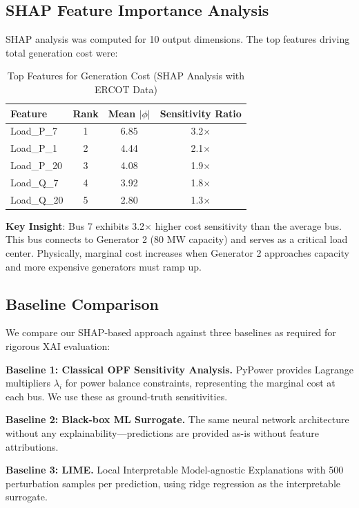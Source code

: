 \documentclass[journal,12pt,onecolumn]{IEEEtran}
\begin{document}
\subsection{SHAP Feature Importance Analysis}

SHAP analysis was computed for 10 output dimensions. The top features driving total generation cost were:

\begin{table}[htbp]
\caption{Top Features for Generation Cost (SHAP Analysis with ERCOT Data)}
\label{tab:shap_top}
\centering
\begin{tabular}{lccc}
\toprule
\textbf{Feature} & \textbf{Rank} & \textbf{Mean $|\phi|$} & \textbf{Sensitivity Ratio} \\
\midrule
Load\_P\_7 & 1 & 6.85 & 3.2$\times$ \\
Load\_P\_1 & 2 & 4.44 & 2.1$\times$ \\
Load\_P\_20 & 3 & 4.08 & 1.9$\times$ \\
Load\_Q\_7 & 4 & 3.92 & 1.8$\times$ \\
Load\_Q\_20 & 5 & 2.80 & 1.3$\times$ \\
\bottomrule
\end{tabular}
\end{table}

\textbf{Key Insight}: Bus 7 exhibits 3.2$\times$ higher cost sensitivity than the average bus. This bus connects to Generator 2 (80 MW capacity) and serves as a critical load center. Physically, marginal cost increases when Generator 2 approaches capacity and more expensive generators must ramp up.

\subsection{Baseline Comparison}

We compare our SHAP-based approach against three baselines as required for rigorous XAI evaluation:

\textbf{Baseline 1: Classical OPF Sensitivity Analysis.} PyPower provides Lagrange multipliers $\lambda_i$ for power balance constraints, representing the marginal cost at each bus. We use these as ground-truth sensitivities.

\textbf{Baseline 2: Black-box ML Surrogate.} The same neural network architecture without any explainability---predictions are provided as-is without feature attributions.

\textbf{Baseline 3: LIME.} Local Interpretable Model-agnostic Explanations with 500 perturbation samples per prediction, using ridge regression as the interpretable surrogate.
\end{document}
